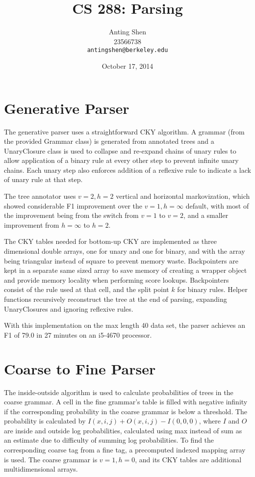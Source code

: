 \documentclass[11pt]{article}
\title{CS 288: Parsing}
\author{Anting Shen \\
  23566738 \\
  {\tt antingshen@berkeley.edu} \\
}
\date{October 17, 2014}
\begin{document}
\maketitle


\section{Generative Parser}

The generative parser uses a straightforward CKY algorithm. A grammar
(from the provided Grammar class) is generated from annotated
trees and a UnaryClosure class is used to collapse and re-expand chains of unary rules to allow
application of a binary rule at every other step to prevent infinite unary chains. Each unary
step also enforces addition of a reflexive rule to indicate a lack of unary rule at that step.

The tree annotator uses $v=2, h=2$ vertical and horizontal markovization, which showed considerable
F1 improvement over the $v=1, h=\infty$ default, with most of the improvement being from the
switch from $v=1$ to $v=2$, and a smaller improvement from $h=\infty$ to $h=2$.

The CKY tables needed for bottom-up CKY are implemented as three dimensional double arrays, one for
unary and one for binary, and with the array being triangular instead of square to prevent memory
waste. Backpointers are kept in a separate same sized array to save memory of
creating a wrapper object and provide memory locality when performing score lookups. Backpointers
consist of the rule used at that cell, and the split point $k$ for binary rules. Helper functions
recursively reconstruct the tree at the end of parsing, expanding UnaryClosures and ignoring reflexive
rules.

With this implementation on the max length 40 data set, the parser achieves an F1 of 79.0
in 27 minutes on an i5-4670 processor.

\section{Coarse to Fine Parser}

The inside-outside algorithm is used to calculate probabilities of trees in the coarse grammar.
A cell in the fine grammar's table is filled with negative infinity if the corresponding probability
in the coarse grammar is below a threshold. The probability is calculated by
$I(x,i,j)+O(x,i,j)-I(0,0,0)$, where $I$ and $O$ are inside and outside log probabilities, calculated
using max instead of sum as an estimate due to difficulty of summing log probabilities.
To find the corresponding coarse tag from a fine tag, a precomputed indexed mapping array is used.
The coarse grammar is $v=1, h=0$, and its CKY tables are additional multidimensional arrays.
\end{document}
